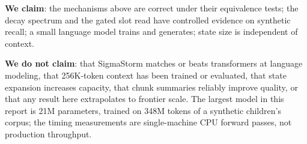 \textbf{We claim}: the mechanisms above are correct under their equivalence tests; the decay
spectrum and the gated slot read have controlled evidence on synthetic recall; a small
language model trains and generates; state size is independent of context.

\textbf{We do not claim}: that SigmaStorm matches or beats transformers at language modeling,
that 256K-token context has been trained or evaluated, that state expansion increases
capacity, that chunk summaries reliably improve quality, or that any result here extrapolates
to frontier scale. The largest model in this report is 21M parameters, trained on 348M tokens
of a synthetic children's corpus; the timing measurements are single-machine CPU forward
passes, not production throughput.
